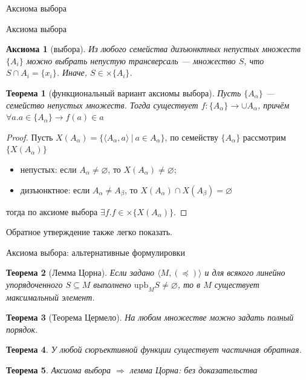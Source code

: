 \documentclass[aspectratio=169]{beamer}
\newtheorem{axm}{Аксиома}[section]
\newtheorem{thm}{Теорема}[section]
\begin{document}
\begin{frame}
\begin{center}\LARGE Аксиома выбора \end{center}
\end{frame}

\begin{frame}{Аксиома выбора}
\begin{axm}[выбора]
Из любого семейства дизъюнктных непустых множеств $\{A_i\}$ можно выбрать непустую трансверсаль --- 
множество $S$, что $S \cap A_i = \{ x_i \}$. Иначе, $S \in \times \{A_i\}$.
\end{axm}

\begin{thm}[функциональный вариант аксиомы выбора]
Пусть $\{A_\alpha\}$ --- семейство непустых множеств. Тогда существует
$f : \{A_\alpha\} \rightarrow \cup A_\alpha$, причём $\forall a.a \in \{A_\alpha\} \rightarrow f(a) \in a$
\end{thm}

\begin{proof}
Пусть $X(A_\alpha) = \{ \langle A_\alpha, a \rangle \ |\ a \in A_\alpha \}$, 
по семейству $\{A_\alpha\}$ рассмотрим $\{X(A_\alpha)\}$
\begin{itemize}
\item непустых: если $A_\alpha \ne \varnothing$, то $X(A_\alpha) \ne \varnothing$;
\item дизъюнктное: если $A_\alpha \ne A_\beta$, то $X(A_\alpha) \cap X(A_\beta) = \varnothing$
\end{itemize}
тогда по аксиоме выбора $\exists f.f \in \times \{ X(A_\alpha) \}$.
\end{proof}
Обратное утверждение также легко показать.
\end{frame}

\begin{frame}{Аксиома выбора: альтернативные формулировки}
\begin{thm}[Лемма Цорна]
Если задано $\langle M, (\preceq) \rangle$ и для всякого линейно упорядоченного $S \subseteq M$ выполнено
$\text{upb}_M S \ne \varnothing$, то в $M$ существует максимальный элемент.
\end{thm}
\begin{thm}[Теорема Цермело]
На любом множестве можно задать полный порядок.
\end{thm}
\begin{thm}
У любой сюръективной функции существует частичная обратная.
\end{thm}

\begin{thm}
Аксиома выбора $\Rightarrow$ лемма Цорна: без доказательства
\end{thm}
\end{frame}
\end{document}
